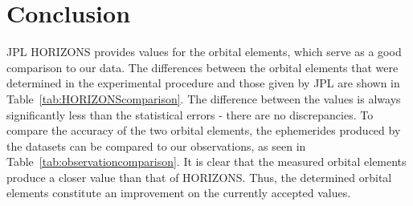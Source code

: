 \documentclass[11pt,a4paper]{article}
\begin{document}
\section{Conclusion}
JPL HORIZONS provides values for the orbital elements, which serve as a good comparison to our data.
The differences between the orbital elements that were determined in the experimental procedure and those given by JPL are shown in Table~\ref{tab:HORIZONScomparison}.
The difference between the values is always significantly less than the statistical errors - there are no discrepancies.
To compare the accuracy of the two orbital elements, the ephemerides produced by the datasets can be compared to our observations, as seen in Table~\ref{tab:observationcomparison}.
It is clear that the measured orbital elements produce a closer value than that of HORIZONS.
Thus, the determined orbital elements constitute an improvement on the currently accepted values.

\begin{table}[!t]
\centering
{}
\caption{Measured orbital elements in comparison with JPL HORIZONS orbital elements \label{tab:HORIZONScomparison}}
\end{table}

\begin{table}[!t]
\centering
{}
\caption{Comparison of JPL HORIZONS ephemeredes and ephemeredes from determined orbital elements with observation data\label{tab:observationcomparison}}
\end{table}
\end{document}
